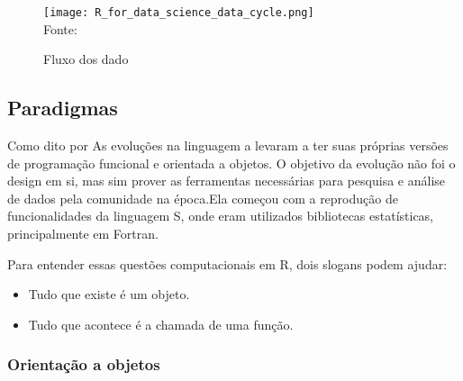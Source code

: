       \begin{figure}[H]
        \begin{center}
          \caption{Fluxo dos dado} \label{R_data_cycle}
          \texttt{[image: R\_for\_data\_science\_data\_cycle.png]} \\
          {\tiny \sf Fonte: \cite{HadleyWickham2017} }
        \end{center}
      \end{figure}

    \subsection{ Paradigmas}

      Como dito por \cite{Chambers2014} As evoluções na linguagem a levaram a ter suas próprias versões de programação funcional e orientada a objetos. O objetivo da evolução não foi o design em si, mas sim prover as ferramentas necessárias para pesquisa e análise de dados pela comunidade na época.Ela começou com a reprodução de funcionalidades da linguagem S, onde eram utilizados bibliotecas estatísticas, principalmente em Fortran.

      \begin{comment}
        In the case of functional programming, the realization in R is only partial, reflecting the language’s origins as well as practical considerations. In the case of OOP, there are now at least three realizations of the ideas in R, using two different paradigms. All three have significant applications and practical value. Despite all these devilish details, the main ideas remain visible and useful, particularly when programming serious applications using the language.
      \end{comment}

      Para entender essas questões computacionais em R, dois slogans podem ajudar:
      \begin{itemize}
        \item Tudo que existe é um objeto.
        \item Tudo que acontece é a chamada de uma função.
      \end{itemize}

      \subsubsection{ Orientação a objetos}

